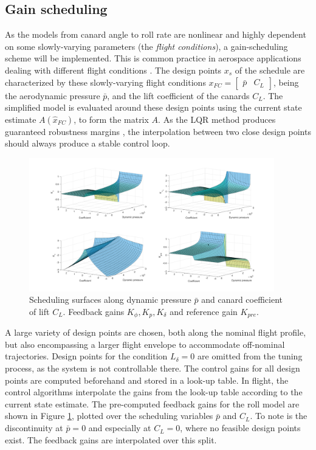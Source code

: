 \subsection{Gain scheduling}
\label{sec:controller-scheduling}
As the models from canard angle to roll rate are nonlinear and highly dependent on some slowly-varying parameters (the \textit{flight conditions}), a gain-scheduling scheme will be implemented. 
This is common practice in aerospace applications dealing with different flight conditions \cite{theis2023}.
The design points $x_s$ of the schedule are characterized by these slowly-varying flight conditions $x_{FC} = \begin{bmatrix} \bar p & C_L \end{bmatrix}$, being the aerodynamic pressure $\bar p$, and the lift coefficient of the canards $C_L$. 
The simplified model is evaluated around these design points using the current state estimate $A(\hat x_{FC})$, to form the matrix $A$.
As the LQR method produces guaranteed robustness margins \cite{doyle1978, werner2021, werner2021b}, the  interpolation between two close design points should always produce a stable control loop.
\begin{figure}[ht]
    \centering
    \includegraphics[width=0.95\textwidth]{images-design/controller_scheduling-surfaces.png}
    \caption[Scheduling surfaces along dynamic pressure and canard coefficient]{Scheduling surfaces along dynamic pressure $\bar p$ and canard coefficient of lift $C_L$. Feedback gains $K_\phi, K_p, K_\delta$ and reference gain $K_\textit{pre}$.}
    \label{fig:controller-surfaces}
\end{figure}

A large variety of design points are chosen, both along the nominal flight profile, but also encompassing a larger flight envelope to accommodate off-nominal trajectories.
Design points for the condition $L_\delta = 0$ are omitted from the tuning process, as the system is not controllable there.
The control gains for all design points are computed beforehand and stored in a look-up table.
In flight, the control algorithms interpolate the gains from the look-up table according to the current state estimate. 
The pre-computed feedback gains for the roll model are shown in Figure \ref{fig:controller-surfaces}, plotted over the scheduling variables $\bar p$ and $C_L$.
To note is the discontinuity at $\bar p = 0$ and especially at $C_L = 0$, where no feasible design points exist. 
The feedback gains are interpolated over this split.


